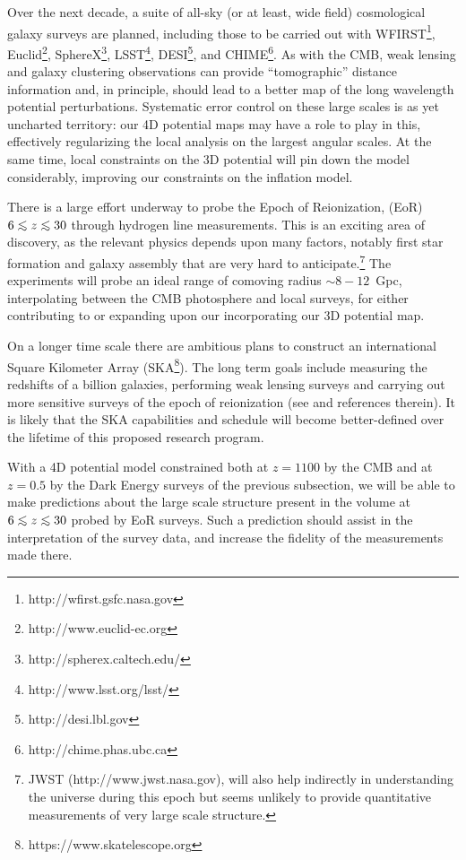 \documentclass[psfig,12pt]{article}
\def\ni{\noindent}
\def\lo{\mathrel{\raise.3ex\hbox{$<$}\mkern-14mu\lower0.6ex\hbox{$\sim$}}}
\begin{document}
{\ni{\bf Survey Telescopes:}
Over the next decade, a suite of all-sky (or at least, wide field)
cosmological galaxy surveys are planned, including those to be carried
out with
WFIRST\footnote{http://wfirst.gsfc.nasa.gov},
Euclid\footnote{http://www.euclid-ec.org},
SphereX\footnote{http://spherex.caltech.edu/},
LSST\footnote{http://www.lsst.org/lsst/},
DESI\footnote{http://desi.lbl.gov},
and
CHIME\footnote{http://chime.phas.ubc.ca}.
As with the CMB, weak lensing and galaxy clustering observations can provide ``tomographic'' distance information and, in principle, should lead to a better map of the long wavelength potential perturbations. Systematic error control on these large scales is as yet uncharted territory: our 4D potential maps may have a role to play in this, effectively regularizing the local analysis on the largest angular scales. At the same time, local constraints on the 3D potential will pin down the  model considerably, improving our constraints on the inflation model.


\ni{\bf Epoch of Reionization:}
There is a large effort underway to probe the Epoch of Reionization, (EoR) $6\lo z\lo30$ through hydrogen line measurements. This is an exciting area of discovery, as the relevant physics depends upon many factors, notably first star formation and galaxy assembly that are very hard to anticipate.\footnote{JWST (http://www.jwst.nasa.gov), will also help indirectly in understanding the universe during this epoch but seems unlikely to provide quantitative measurements of very large scale structure.} The experiments will probe an ideal range of comoving radius $\sim8-12$~Gpc, interpolating between the CMB photosphere and local surveys,  for either contributing to or expanding upon our incorporating our 3D potential map.

On a longer time scale there are ambitious plans to construct an international Square Kilometer Array (SKA\footnote{https://www.skatelescope.org}). The long term goals include measuring the redshifts of a billion galaxies, performing weak lensing surveys and carrying out more sensitive surveys of the epoch of reionization (see  \cite{SKACosmology} and references therein). It is likely that the SKA capabilities and schedule will become better-defined over the lifetime of this proposed research program.

With a 4D potential model constrained both at $z=1100$ by the CMB and at $z=0.5$ by the Dark Energy surveys of the previous subsection, we will be able to make predictions about the large scale structure present in the volume at $6\lo z\lo30$ probed by EoR surveys. Such a prediction should assist in the interpretation of the survey data, and increase the fidelity of the measurements made there.


}
\end{document}
